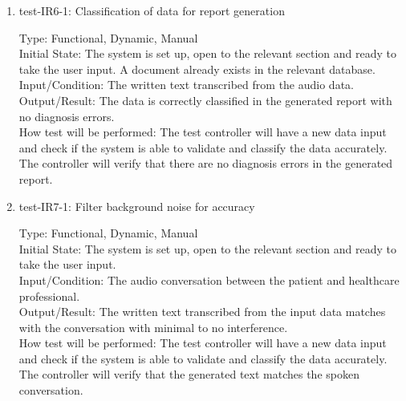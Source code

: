 \documentclass[12pt, titlepage]{article}
\begin{document}
\begin{enumerate}
    


    \item{test-IR6-1}: Classification of data for report generation \label{test-IR6-1}
    
    Type: Functional, Dynamic, Manual\\
    
    Initial State: The system is set up, open to the relevant section and ready to take the user input. A document already exists in the relevant database.\\
    
    Input/Condition: The written text transcribed from the audio data.\\
    
    Output/Result: The data is correctly classified in the generated report with no diagnosis errors.\\
    
    How test will be performed: The test controller will have a new data input and check if the system is able to validate and classify the data accurately. The controller will verify that there are no diagnosis errors in the generated report.\\


    \item{test-IR7-1}: Filter background noise for accuracy \label{test-IR7-1}
    
    Type: Functional, Dynamic, Manual\\
    
    Initial State: The system is set up, open to the relevant section and ready to take the user input.\\
    
    Input/Condition: The audio conversation between the patient and healthcare professional.\\
    
    Output/Result: The written text transcribed from the input data matches with the conversation with minimal to no interference.\\ 

    How test will be performed: The test controller will have a new data input and check if the system is able to validate and classify the data accurately. The controller will verify that the generated text matches the spoken conversation.\\

\end{enumerate}
\end{document}
